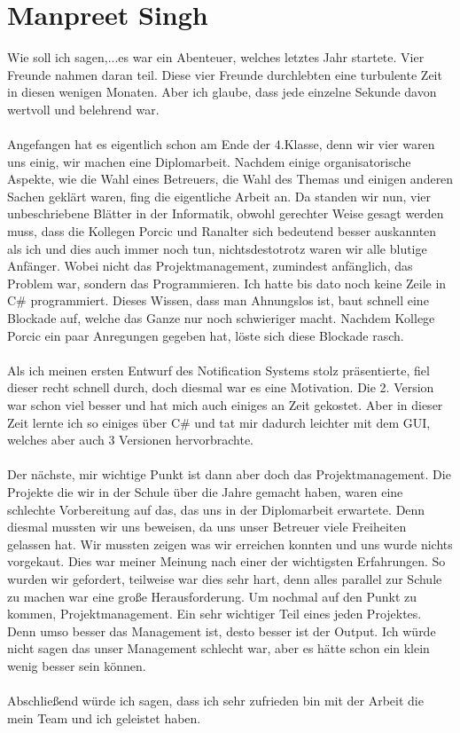 \documentclass[12pt,a4paper]{report}
\begin{document}
\chapter{Manpreet Singh}
Wie soll ich sagen,...es war ein Abenteuer, welches letztes Jahr startete. Vier Freunde nahmen daran teil. Diese vier Freunde durchlebten eine turbulente Zeit in diesen wenigen Monaten. Aber ich glaube, dass jede einzelne Sekunde davon wertvoll und belehrend war. \\\\
Angefangen hat es eigentlich schon am Ende der 4.Klasse, denn wir vier waren uns einig, wir machen eine Diplomarbeit. Nachdem einige organisatorische Aspekte, wie die Wahl eines Betreuers, die Wahl des Themas und einigen anderen Sachen geklärt waren, fing die eigentliche Arbeit an. Da standen wir nun, vier unbeschriebene Blätter in der Informatik, obwohl gerechter Weise gesagt werden muss, dass die Kollegen Porcic und Ranalter sich bedeutend besser auskannten als ich und dies auch immer noch tun, nichtsdestotrotz waren wir alle blutige Anfänger. Wobei nicht das Projektmanagement, zumindest anfänglich, das Problem war, sondern das Programmieren. Ich hatte bis dato noch keine Zeile in C\# programmiert. Dieses Wissen, dass man Ahnungslos ist, baut schnell eine Blockade auf, welche das Ganze nur noch schwieriger macht. Nachdem Kollege Porcic ein paar Anregungen gegeben hat, löste sich diese Blockade rasch.\\\\
Als ich meinen ersten Entwurf des Notification Systems stolz präsentierte, fiel dieser recht schnell durch, doch diesmal war es eine Motivation. Die 2. Version war schon viel besser und hat mich auch einiges an Zeit gekostet. Aber in dieser Zeit lernte ich so einiges über C\# und tat mir dadurch leichter mit dem GUI, welches aber auch 3 Versionen hervorbrachte.\\\\
Der nächste, mir wichtige Punkt ist dann aber doch das Projektmanagement. Die Projekte die wir in der Schule über die Jahre gemacht haben, waren eine schlechte Vorbereitung auf das, das uns in der Diplomarbeit erwartete. Denn diesmal mussten wir uns beweisen, da uns unser Betreuer viele Freiheiten gelassen hat. Wir mussten zeigen was wir erreichen konnten und uns wurde nichts vorgekaut. Dies war meiner Meinung nach einer der wichtigsten Erfahrungen. So wurden wir gefordert, teilweise war dies sehr hart, denn alles parallel zur Schule zu machen war eine große Herausforderung. Um nochmal auf den Punkt zu kommen, Projektmanagement. Ein sehr wichtiger Teil eines jeden Projektes. Denn umso besser das Management ist, desto besser ist der Output. Ich würde nicht sagen das unser Management schlecht war, aber es hätte schon ein klein wenig besser sein können.\\\\
Abschließend würde ich sagen, dass ich sehr zufrieden bin mit der Arbeit die mein Team und ich geleistet haben.
\end{document}

